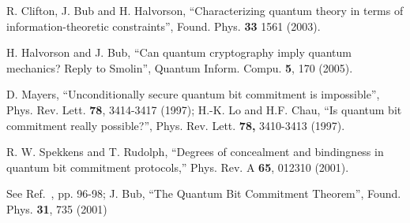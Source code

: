 \documentclass[pra,nofootinbib,showpacs,12pt]{revtex4}
\begin{document}
\begin{thebibliography}{99}
 R. Clifton, J. Bub and H. Halvorson, ``Characterizing quantum
theory in terms of information-theoretic constraints'', Found.
Phys. \textbf{33} 1561 (2003).


 H. Halvorson and J. Bub, ``Can quantum cryptography
imply quantum mechanics? Reply to Smolin'', Quantum Inform. Compu.
\textbf{5}, 170 (2005).

 D. Mayers, ``Unconditionally secure quantum bit
commitment is impossible'', Phys. Rev. Lett. \textbf{78}, 3414-3417 (1997);
H.-K. Lo and H.F. Chau, ``Is quantum bit commitment really possible?'',
Phys. Rev. Lett. \textbf{78,} 3410-3413 (1997).

 R. W. Spekkens and T. Rudolph, ``Degrees of
concealment and bindingness in quantum bit commitment protocols,'' Phys.
Rev. A \textbf{65}, 012310 (2001).

 See Ref.~\cite{Fuchssamizdat}, pp. 96-98; J. Bub,
``The Quantum Bit Commitment Theorem'', Found. Phys. \textbf{31}, 735 (2001)
\end{thebibliography}
\end{document}
